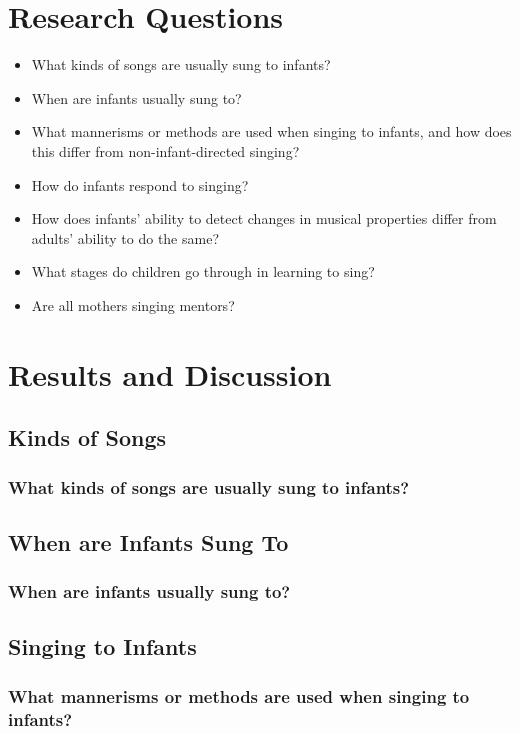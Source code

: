 \documentclass{beamer}
\begin{document}
\section{Research Questions}
\begin{frame}
	\begin{itemize}
		\item What kinds of songs are usually sung to infants?
		\item When are infants usually sung to?
		\item What mannerisms or methods are used when singing to infants, and how does this differ from non-infant-directed singing?
		\item How do infants respond to singing?
		\item How does infants' ability to detect changes in musical properties differ from adults' ability to do the same? %
		\item What stages do children go through in learning to sing?
		\item Are all mothers singing mentors?
	\end{itemize}
\end{frame}

\section{Results and Discussion}
\subsection*{Kinds of Songs}
\begin{frame}
	\frametitle{What kinds of songs are usually sung to infants?}
\end{frame}

\subsection*{When are Infants Sung To}

\begin{frame}
	\frametitle{When are infants usually sung to?}
\end{frame}

\subsection*{Singing to Infants}

\begin{frame}
	\frametitle{What mannerisms or methods are used when singing to infants?}
\end{frame}
\end{document}
